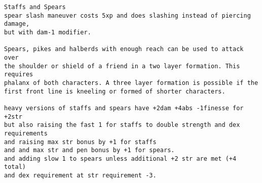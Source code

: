 \goodbreak \small \begin{samepage} \begin{verbatim}
Staffs and Spears
spear slash maneuver costs 5xp and does slashing instead of piercing damage,
but with dam-1 modifier.

Spears, pikes and halberds with enough reach can be used to attack over
the shoulder or shield of a friend in a two layer formation. This requires
phalanx of both characters. A three layer formation is possible if the
first front line is kneeling or formed of shorter characters.

heavy versions of staffs and spears have +2dam +4abs -1finesse for +2str
but also raising the fast 1 for staffs to double strength and dex requirements
and raising max str bonus by +1 for staffs
and and max str and pen bonus by +1 for spears.
and adding slow 1 to spears unless additional +2 str are met (+4 total)
and dex requirement at str requirement -3.


\end{verbatim}
\end{samepage}
